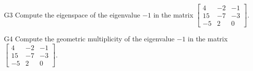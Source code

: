 \documentclass{sbgLAsemi}
\begin{document}
\begin{problem}{G3}
Compute the eigenspace of the eigenvalue $-1$ in the matrix $\begin{bmatrix} 4 & -2 & -1 \\ 15 & -7 & -3 \\ -5 & 2 & 0 \end{bmatrix}$.
\end{problem}

\begin{problem}{G4}
Compute the geometric multiplicity of the eigenvalue $-1$ in the matrix $\begin{bmatrix} 4 & -2 & -1 \\ 15 & -7 & -3 \\ -5 & 2 & 0 \end{bmatrix}$.  
\end{problem}
\end{document}
